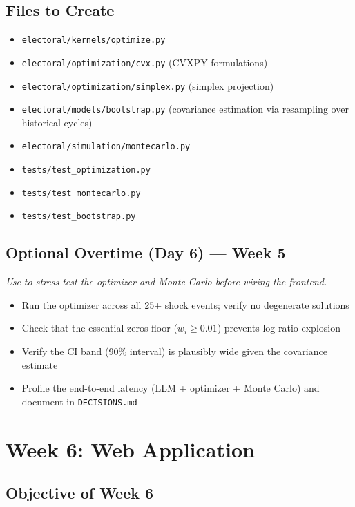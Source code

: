 \documentclass[11pt]{article}
\begin{document}
\subsection*{Files to Create}

\begin{itemize}[leftmargin=1.6em, itemsep=2pt]
  \item \texttt{electoral/kernels/optimize.py}
  \item \texttt{electoral/optimization/cvx.py} (CVXPY formulations)
  \item \texttt{electoral/optimization/simplex.py} (simplex projection)
  \item \texttt{electoral/models/bootstrap.py} (covariance estimation via
        resampling over historical cycles)
  \item \texttt{electoral/simulation/montecarlo.py}
  \item \texttt{tests/test\_optimization.py}
  \item \texttt{tests/test\_montecarlo.py}
  \item \texttt{tests/test\_bootstrap.py}
\end{itemize}

\subsection*{Optional Overtime (Day 6) --- Week 5}
\textit{Use to stress-test the optimizer and Monte Carlo before wiring the frontend.}
\begin{itemize}[leftmargin=1.6em, itemsep=2pt]
  \item Run the optimizer across all 25+ shock events; verify no degenerate solutions
  \item Check that the essential-zeros floor ($w_i \geq 0.01$) prevents log-ratio explosion
  \item Verify the CI band (90\% interval) is plausibly wide given the covariance estimate
  \item Profile the end-to-end latency (LLM + optimizer + Monte Carlo) and document in \texttt{DECISIONS.md}
\end{itemize}

\section{Week 6: Web Application}

\subsection*{Objective of Week 6}
\end{document}
